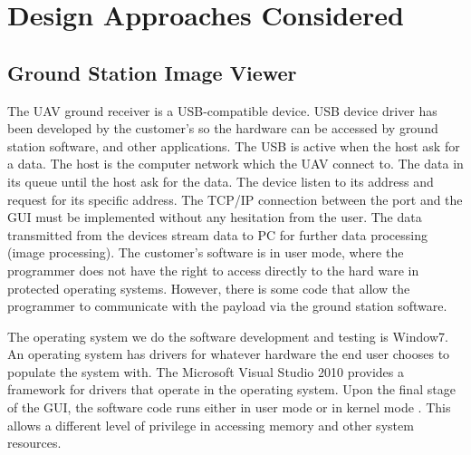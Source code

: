 \chapter{Design Approaches Considered}









\section{Ground Station Image Viewer}
The UAV ground receiver is a USB-compatible device. USB device driver has been developed by the customer’s so the hardware can be accessed by ground station software, and other applications. The USB is active when the host ask for a data. The host is the computer network which the UAV connect to. The data in its queue until the host ask for the data. The device listen to its address and request for its specific address. The TCP/IP connection between the port and the GUI must be implemented without any hesitation from the user. The data transmitted from the devices stream data to PC for further data processing (image processing).  The customer’s software is in user mode, where the programmer does not have the right to access directly to the hard ware in protected operating systems. However, there is some code that allow the programmer to communicate with the payload via the ground station software.

The operating system we do the software development and testing is Window7. An operating system has drivers for whatever hardware the end user chooses to populate the system with. The Microsoft Visual Studio 2010 provides a framework for drivers that operate in the operating system. Upon the final stage of the GUI, the software code runs either in user mode or in kernel mode \cite{tsuiK}. This allows a different level of privilege in accessing memory and other system resources. 
